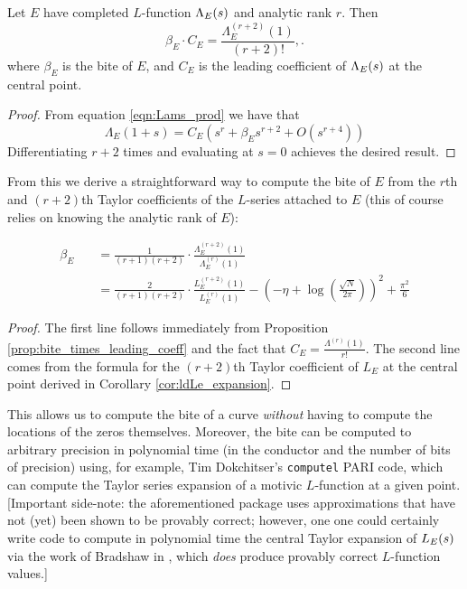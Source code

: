 \begin{proposition}\label{prop:bite_times_leading_coeff}
Let $E$ have completed $L$-function $\Lambda_E(s)$ and analytic rank $r$. Then
\begin{equation}
\beta_E\cdot C_E = \frac{\Lambda_E^{(r+2)}(1)}{(r+2)!},.
\end{equation}
where $\beta_E$ is the bite of $E$, and $C_E$ is the leading coefficient of $\Lambda_E(s)$ at the central point.
\end{proposition}
\begin{proof}
From equation \ref{eqn:Lams_prod} we have that 
\begin{equation}
\Lambda_E(1+s) = C_E\left(s^r + \beta_E s^{r+2} + O(s^{r+4})\right)
\end{equation}
Differentiating $r+2$ times and evaluating at $s=0$ achieves the desired result.
\end{proof}

From this we derive a straightforward way to compute the bite of $E$ from the $r$th and $(r+2)$th Taylor coefficients of the $L$-series attached to $E$ (this of course relies on knowing the analytic rank of $E$):
\begin{corollary}
\begin{align}
\beta_E \quad &= \frac{1}{(r+1)(r+2)} \cdot \frac{\Lambda_E^{(r+2)}(1)}{\Lambda_E^{(r)}(1)} \\
&= \frac{2}{(r+1)(r+2)} \cdot \frac{L_E^{(r+2)}(1)}{L_E^{(r)}(1)} - \left(-\eta+\log\left(\frac{\sqrt{N}}{2\pi}\right)\right)^2 + \frac{\pi^2}{6}
\end{align}
\end{corollary}
\begin{proof}
The first line follows immediately from Proposition \ref{prop:bite_times_leading_coeff} and the fact that $C_E = \frac{\Lambda^{(r)}(1)}{r!}$. The second line comes from the formula for the $(r+2)$th Taylor coefficient of $L_E$ at the central point derived in Corollary \ref{cor:ldLe_expansion}.
\end{proof}
This allows us to compute the bite of a curve {\it without} having to compute the locations of the zeros themselves. Moreover, the bite can be computed to arbitrary precision in polynomial time (in the conductor and the number of bits of precision) using, for example, Tim Dokchitser's {\tt computel} PARI code, which can compute the Taylor series expansion of a motivic $L$-function at a given point. [Important side-note: the aforementioned package uses approximations that have not (yet) been shown to be provably correct; however, one one could certainly write code to compute in polynomial time the central Taylor expansion of $L_E(s)$ via the work of Bradshaw in \cite{Bra-2010}, which {\it does} produce provably correct $L$-function values.] \\

